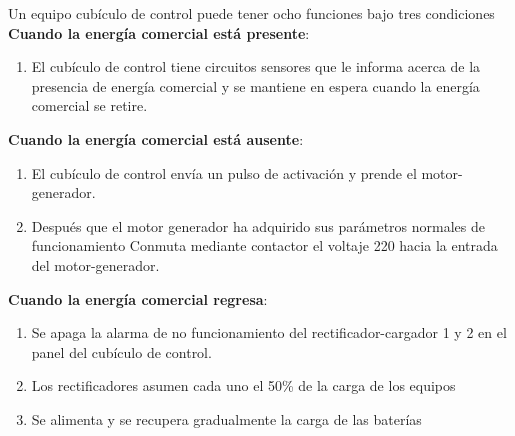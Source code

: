 \documentclass[
	12pt, %
	fleqn, %
	a4paper, %
]{LegrandOrangeBook}
\begin{document}
\begin{example}
Un equipo cubículo de control puede tener ocho funciones bajo tres condiciones\\
\textbf{Cuando la energía comercial está presente}:
\begin{enumerate}
\item El cubículo de control tiene circuitos sensores que le informa acerca de la presencia de energía comercial y se mantiene en espera cuando la energía comercial se retire.
\end{enumerate}
\textbf{Cuando la energía comercial está ausente}:
\begin{enumerate}
\item El cubículo de control envía un pulso de activación y prende el motor-generador.
\item Después que el motor generador ha adquirido sus parámetros normales de funcionamiento Conmuta mediante contactor el voltaje 220 hacia la entrada del motor-generador.
\end{enumerate}
\textbf{Cuando la energía comercial regresa}:
\begin{enumerate}
\item Se apaga la alarma de no funcionamiento del rectificador-cargador 1 y 2 en el panel del
cubículo de control.
\item Los rectificadores asumen cada uno el 50\% de la carga de los equipos
\item Se alimenta y se recupera gradualmente la carga de las baterías
\end{enumerate}
\end{example}
\end{document}
